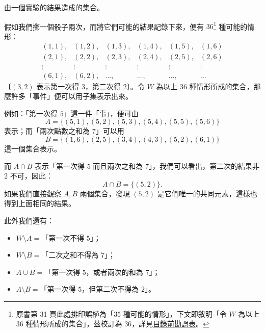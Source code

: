 \begin{example}\label{ex:2-3-12}
由一個實驗的結果造成的集合。

假如我們擲一個骰子兩次，而將它們可能的結果記錄下來，便有 $36$\footnote{原書第 31 頁此處排印誤植為「$35$ 種可能的情形」，下文即敘明「令 $W$ 為以上 $36$ 種情形所成的集合」，茲校訂為 $36$，詳見\hyperref[sec:master_errata_notes]{目錄前勘誤表}。} 種可能的情形：
\begin{equation*}
\begin{array}{cccccc}
  (1, 1), & (1, 2), & (1, 3), & (1, 4), & (1, 5), & (1, 6) \\
  (2, 1), & (2, 2), & (2, 3), & (2, 4), & (2, 5), & (2, 6) \\
  \vdots & \vdots & \vdots & \vdots & \vdots & \vdots \\
  (6, 1), & (6, 2), & \dots, & \dots, & \dots, & \dots
\end{array}
\end{equation*}
〔$(3, 2)$ 表示第一次得 $3$，第二次得 $2$〕。令 $W$ 為以上 $36$ 種情形所成的集合，那麼許多「事件」便可以用子集表示出來。

例如：「第一次得 $5$」這一件「事」，便可由
\begin{equation*}
  A = \{(5, 1), (5, 2), (5, 3), (5, 4), (5, 5), (5, 6)\}
\end{equation*}
表示；而「兩次點數之和為 $7$」可以用
\begin{equation*}
  B = \{(1, 6), (2, 5), (3, 4), (4, 3), (5, 2), (6, 1)\}
\end{equation*}
這一個集合表示。

而 $A \cap B$ 表示「第一次得 $5$ 而且兩次之和為 $7$」，我們可以看出，第二次的結果非 $2$ 不可，因此：
\begin{equation*}
  A \cap B = \{(5, 2)\}.
\end{equation*}
如果我們直接觀察 $A, B$ 兩個集合，發現 $(5, 2)$ 是它們唯一的共同元素，這樣也得到上面相同的結果。

此外我們還有：
\begin{itemize}
  \item $W \setminus A =$「第一次不得 $5$」；
  \item $W \setminus B =$「二次之和不得為 $7$」；
  \item $A \cup B =$「第一次得 $5$，或者兩次的和為 $7$」；
  \item $A \setminus B =$「第一次得 $5$，但第二次不得為 $2$」。
\end{itemize}
\end{example}

